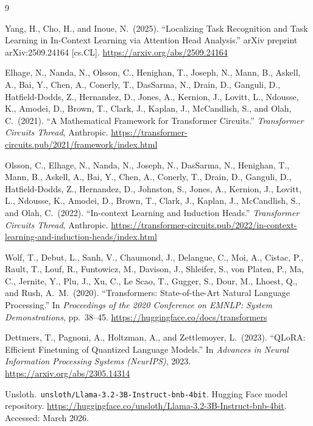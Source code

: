 \documentclass[twoside,english]{article}
\begin{document}
\begin{thebibliography}{9}

Yang, H., Cho, H., and Inoue, N.\ (2025).
``Localizing Task Recognition and Task Learning in In-Context Learning via Attention Head Analysis.''
arXiv preprint arXiv:2509.24164 [cs.CL].
\url{https://arxiv.org/abs/2509.24164}

Elhage, N., Nanda, N., Olsson, C., Henighan, T., Joseph, N., Mann, B., Askell, A., Bai, Y., Chen, A., Conerly, T., DasSarma, N., Drain, D., Ganguli, D., Hatfield-Dodds, Z., Hernandez, D., Jones, A., Kernion, J., Lovitt, L., Ndousse, K., Amodei, D., Brown, T., Clark, J., Kaplan, J., McCandlish, S., and Olah, C.\ (2021).
``A Mathematical Framework for Transformer Circuits.''
\textit{Transformer Circuits Thread}, Anthropic.
\url{https://transformer-circuits.pub/2021/framework/index.html}

Olsson, C., Elhage, N., Nanda, N., Joseph, N., DasSarma, N., Henighan, T., Mann, B., Askell, A., Bai, Y., Chen, A., Conerly, T., Drain, D., Ganguli, D., Hatfield-Dodds, Z., Hernandez, D., Johnston, S., Jones, A., Kernion, J., Lovitt, L., Ndousse, K., Amodei, D., Brown, T., Clark, J., Kaplan, J., McCandlish, S., and Olah, C.\ (2022).
``In-context Learning and Induction Heads.''
\textit{Transformer Circuits Thread}, Anthropic.
\url{https://transformer-circuits.pub/2022/in-context-learning-and-induction-heads/index.html}

Wolf, T., Debut, L., Sanh, V., Chaumond, J., Delangue, C., Moi, A., Cistac, P., Rault, T., Louf, R., Funtowicz, M., Davison, J., Shleifer, S., von Platen, P., Ma, C., Jernite, Y., Plu, J., Xu, C., Le Scao, T., Gugger, S., Dour, M., Lhoest, Q., and Rush, A.~M.\ (2020).
``Transformers: State-of-the-Art Natural Language Processing.''
In \textit{Proceedings of the 2020 Conference on EMNLP: System Demonstrations}, pp.\ 38--45.
\url{https://huggingface.co/docs/transformers}

Dettmers, T., Pagnoni, A., Holtzman, A., and Zettlemoyer, L.\ (2023).
``QLoRA: Efficient Finetuning of Quantized Language Models.''
In \textit{Advances in Neural Information Processing Systems (NeurIPS)}, 2023.
\url{https://arxiv.org/abs/2305.14314}

Unsloth.\ \texttt{unsloth/Llama-3.2-3B-Instruct-bnb-4bit}.
Hugging Face model repository.
\url{https://huggingface.co/unsloth/Llama-3.2-3B-Instruct-bnb-4bit}.
Accessed: March 2026.

\end{thebibliography}
\end{document}
